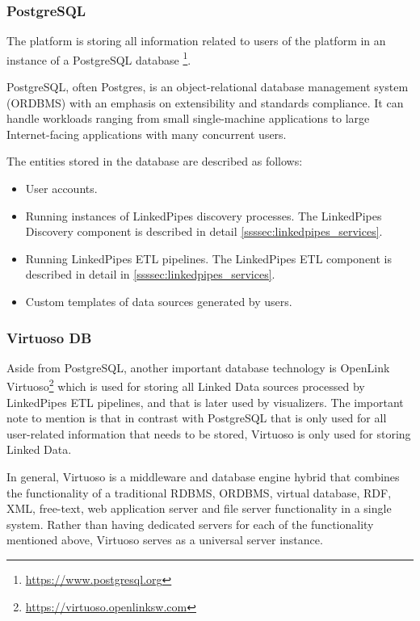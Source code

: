 \subsubsection{PostgreSQL} 

The \lpa{} platform is storing all information related to users of the platform in an instance of a PostgreSQL database \footnote{\url{https://www.postgresql.org}}. 

PostgreSQL, often Postgres, is an object-relational database management system (ORDBMS) with an emphasis on extensibility and standards compliance. It can handle workloads ranging from small single-machine applications to large Internet-facing applications with many concurrent users.

The entities stored in the database are described as follows:
\begin{itemize}
\item User accounts.
\item Running instances of LinkedPipes discovery processes. The LinkedPipes Discovery component is described in detail \autoref{ssssec:linkedpipes_services}.
\item Running LinkedPipes ETL pipelines. The LinkedPipes ETL component is described in detail in \autoref{ssssec:linkedpipes_services}.
\item Custom templates of data sources generated by users.
\end{itemize}

\subsubsection{Virtuoso DB}

Aside from PostgreSQL, another important database technology is OpenLink Virtuoso\footnote{\url{https://virtuoso.openlinksw.com}} which is used for storing all Linked Data sources processed by LinkedPipes ETL pipelines, and that is later used by \lpa{} visualizers. The important note to mention is that in contrast with PostgreSQL that is only used for all user-related information that needs to be stored, Virtuoso is only used for storing Linked Data. 

In general, Virtuoso is a middleware and database engine hybrid that combines the functionality of a traditional \acrfull{RDBMS}, \acrfull{ORDBMS}, virtual database, RDF, XML, free-text, web application server and file server functionality in a single system. Rather than having dedicated servers for each of the functionality mentioned above, Virtuoso serves as a universal server instance.

